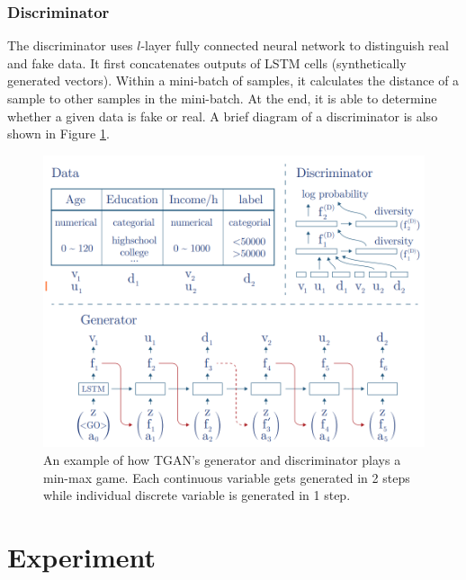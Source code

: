 \documentclass[conference]{IEEEtran}
\begin{document}
\subsubsection{Discriminator}
The discriminator uses $l$-layer fully connected neural network to distinguish real and fake data. It first concatenates outputs of LSTM cells (synthetically generated vectors). Within a mini-batch of samples, it calculates the distance of a sample to other samples in the mini-batch. At the end, it is able to determine whether a given data is fake or real. A brief diagram of a discriminator is also shown in Figure \ref{fig:tgan_structure}.

\begin{figure}[h]
\centering
\includegraphics[width=\columnwidth, height=\textwidth, keepaspectratio]{graphics/tgan_structure.png}
\caption{An example of how TGAN's generator and discriminator plays a min-max game. Each continuous variable gets generated in 2 steps while individual discrete variable is generated in 1 step.}
\label{fig:tgan_structure}
\end{figure}

\section{Experiment}
\end{document}
